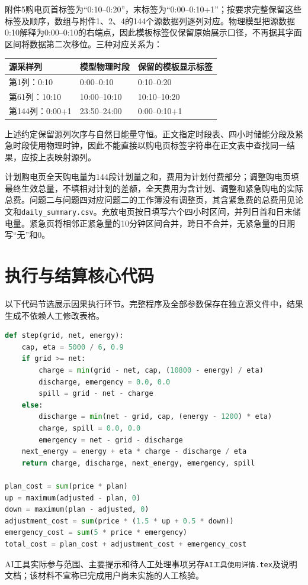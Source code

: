 附件5购电页首标签为“0:10--0:20”，末标签为“0:00--0:10+1”；按要求完整保留这些标签及顺序，数组与附件1、2、4的144个源数据列逐列对应。物理模型把源数据0:10解释为0:00--0:10的右端点，因此模板标签仅保留原始展示口径，不再据其字面区间将数据第二次移位。三种对应关系为：
\begin{center}\small
\begin{tabular}{lll}\toprule
源采样列 & 模型物理时段 & 保留的模板显示标签\\\midrule
第1列：0:10 & 0:00--0:10 & 0:10--0:20\\
第61列：10:10 & 10:00--10:10 & 10:10--10:20\\
第144列：0:00+1 & 23:50--24:00 & 0:00--0:10+1\\
\bottomrule\end{tabular}
\end{center}
上述约定保留源列次序与自然日能量守恒。正文指定时段表、四小时储能分段及紧急时段使用物理时钟，因此不能直接以购电页标签字符串在正文表中查找同一结果，应按上表映射源列。

计划购电页全天购电量为144段计划量之和，费用为计划付费部分；调整购电页填最终生效总量，不填相对计划的差额，全天费用为含计划、调整和紧急购电的实际总费。问题二与问题四对应问题二的工作簿没有调整页，其含紧急费的总费用见论文和\texttt{daily\_summary.csv}。充放电页按日填写六个四小时区间，并列日首和日末储电量。紧急页将相邻正紧急量的10分钟区间合并，跨日不合并，无紧急量的日期写“无”和0。

\section{执行与结算核心代码}

以下代码节选展示因果执行环节。完整程序及全部参数保存在独立源文件中，结果生成不依赖人工修改表格。
\begin{lstlisting}[language=Python,basicstyle=\ttfamily\footnotesize]
def step(grid, net, energy):
    cap, eta = 5000 / 6, 0.9
    if grid >= net:
        charge = min(grid - net, cap, (10800 - energy) / eta)
        discharge, emergency = 0.0, 0.0
        spill = grid - net - charge
    else:
        discharge = min(net - grid, cap, (energy - 1200) * eta)
        charge, spill = 0.0, 0.0
        emergency = net - grid - discharge
    next_energy = energy + eta * charge - discharge / eta
    return charge, discharge, next_energy, emergency, spill

plan_cost = sum(price * plan)
up = maximum(adjusted - plan, 0)
down = maximum(plan - adjusted, 0)
adjustment_cost = sum(price * (1.5 * up + 0.5 * down))
emergency_cost = sum(5 * price * emergency)
total_cost = plan_cost + adjustment_cost + emergency_cost
\end{lstlisting}

AI工具实际参与范围、主要提示和待人工处理事项另存\texttt{AI工具使用详情.tex}及说明文档；该材料不宣称已完成用户尚未实施的人工核验。
